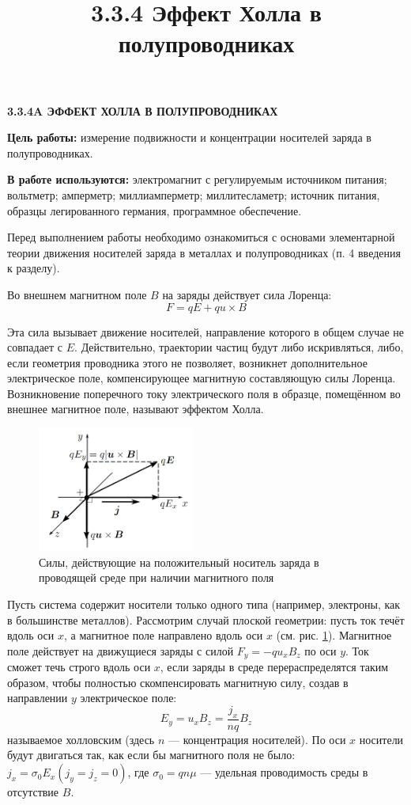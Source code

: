 \documentclass[a4paper,12pt]{article} %
\title{3.3.4 Эффект Холла в полупроводниках}
\date{}
\begin{document}
\begin{center}
\textsf{\textbf{3.3.4A ЭФФЕКТ ХОЛЛА В ПОЛУПРОВОДНИКАХ}}
\end{center}

\textbf{Цель работы:} измерение подвижности и концентрации носителей заряда
в полупроводниках.

\textbf{В работе используются:} электромагнит с регулируемым источником питания; вольтметр; амперметр; миллиамперметр; миллитесламетр; источник питания, образцы легированного германия, программное обеспечение.

Перед выполнением работы необходимо ознакомиться с основами элементарной теории движения носителей заряда в металлах и полупроводниках (п. 4 введения к разделу).


Во внешнем магнитном поле $B$ на заряды действует сила Лоренца:
\begin{equation}
F = qE+qu\times B
\end{equation}

Эта сила вызывает движение носителей, направление которого в общем
случае не совпадает с $E$. Действительно, траектории частиц будут либо
искривляться, либо, если геометрия проводника этого не позволяет,
возникнет дополнительное электрическое поле, компенсирующее магнитную
составляющую силы Лоренца. Возникновение поперечного току
электрического поля в образце, помещённом во внешнее магнитное поле,
называют \textsf{эффектом Холла}.

\begin{figure}[h!]
\begin{center}
\includegraphics[width=0.46\textwidth]{Teor}
\caption{Силы, действующие на положительный носитель заряда в проводящей
среде при наличии магнитного поля} \label{силы}
\end{center}
\end{figure}

Пусть система содержит носители только одного типа (например,
электроны, как в большинстве металлов). Рассмотрим случай плоской геометрии: пусть ток течёт вдоль оси $x$, а магнитное поле направлено вдоль оси $x$ (см. рис. \ref{силы}). Магнитное поле действует на движущиеся заряды с силой $F_y=-qu_xB_z$ по оси $y$. Ток сможет
течь строго вдоль оси $x$, если заряды в среде перераспределятся таким
образом, чтобы полностью скомпенсировать магнитную силу, создав в
направлении $y$ электрическое поле:
\begin{equation}
\label{E_y}
E_y=u_xB_z=\dfrac{j_x}{nq}B_z
\end{equation}
называемое \textsf{холловским} (здесь $n$ — концентрация носителей). По оси
$x$ носители будут двигаться так, как если бы магнитного поля не было:
$j_x=\sigma_0 E_x (j_y = j_z = 0)$, где $\sigma_0 = qn\mu$ — удельная проводимость среды в отсутствие $B$.
\end{document}
